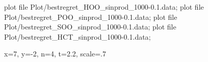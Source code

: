 \documentclass{article}
\begin{document}
{\begin{mygraph}
                {}{}
   plot file {Plot/bestregret_HOO_sinprod_1000-0.1.data};
   plot file {Plot/bestregret_POO_sinprod_1000-0.1.data};
   plot file {Plot/bestregret_SOO_sinprod_1000-0.1.data};
   plot file {Plot/bestregret_HCT_sinprod_1000-0.1.data};
  \begin{mylegend}{x=7, y=-2, n=4, t=2.2, scale=.7}
	  \end{mylegend}
\end{mygraph}}
\end{document}

